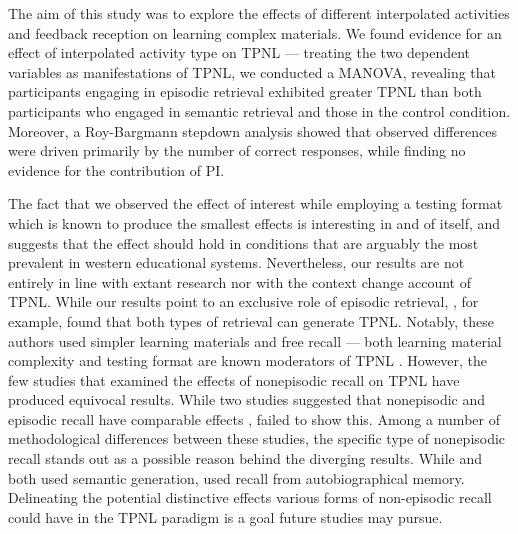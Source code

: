 \documentclass[../main.tex]{subfiles}
\begin{document}
The aim of this study was to explore the effects of different interpolated  
activities and feedback reception on learning complex materials. We found 
evidence for an effect of interpolated activity type on TPNL — treating the 
two dependent variables as manifestations of TPNL, we conducted a MANOVA, 
revealing that participants engaging in episodic retrieval exhibited greater 
TPNL than both participants who engaged in semantic retrieval and those in 
the control condition. Moreover, a Roy-Bargmann stepdown analysis showed 
that observed differences were driven primarily by the number of correct 
responses, while finding no evidence for the contribution of PI.

The fact that we observed the effect of interest while employing a testing 
format which is known to produce the smallest effects is interesting in and 
of itself, and suggests that the effect should hold in conditions that are 
arguably the most prevalent in western educational systems. Nevertheless, 
our results are not entirely in line with extant research nor with the 
context change account of TPNL. While our results point to an exclusive role 
of episodic retrieval, \cite{pastotterRetrievalLearningFacilitates2011}, for 
example, found that both types of retrieval can generate TPNL. Notably, 
these authors used simpler learning materials and free recall — both 
learning material complexity and testing format are known moderators of TPNL 
\citep{chanRetrievalPotentiatesNew2018}. However, the few studies that 
examined the effects of nonepisodic recall on TPNL have produced equivocal 
results. While two studies suggested that nonepisodic and episodic recall 
have comparable effects \citep{divisRetrievalSpeedsContext2014, 
pastotterRetrievalLearningFacilitates2011}, 
\cite{weinsteinNotAllRetrieval2015} failed to show this. Among a number of 
methodological differences between these studies, the specific type of 
nonepisodic recall stands out as a possible reason behind the diverging 
results. While \cite{pastotterRetrievalLearningFacilitates2011} and 
\cite{divisRetrievalSpeedsContext2014} both used semantic generation, 
\cite{weinsteinNotAllRetrieval2015} used recall from autobiographical 
memory. Delineating the potential distinctive effects various forms of 
non-episodic recall could have in the TPNL paradigm is a goal future studies 
may pursue.
\end{document}
